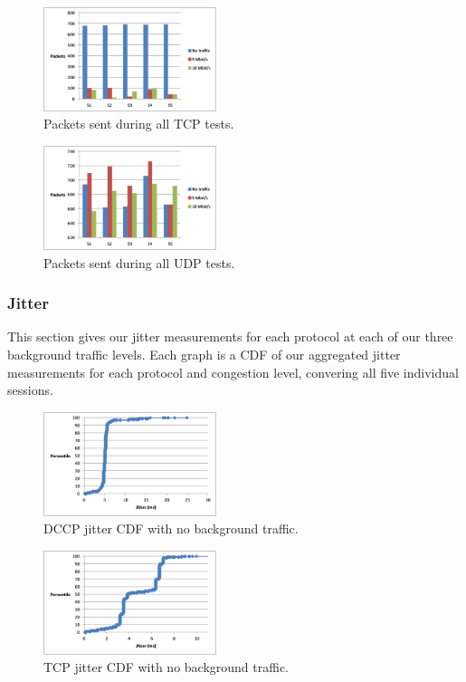 \documentclass[9pt,twocolumn]{article}
\begin{document}
\begin{figure}[h]
   \centering
      \includegraphics[width=0.45\textwidth]{pics/tcp_sent}
   \caption{Packets sent during all TCP tests.}
\label{fig:tcp_sent}
\end{figure}

\begin{figure}[h]
   \centering
      \includegraphics[width=0.45\textwidth]{pics/udp_sent}
   \caption{Packets sent during all UDP tests.}
\label{fig:udp_sent}
\end{figure}

\subsubsection{Jitter}

This section gives our jitter measurements for each protocol at each of our
three background traffic levels. Each graph is a CDF of our aggregated jitter
measurements for each protocol and congestion level, convering all five
individual sessions.

\begin{figure}[h]
   \centering
      \includegraphics[width=0.45\textwidth]{pics/dccp_none_jitter}
   \caption{DCCP jitter CDF with no background traffic.}
\label{fig:dccp_none_jitter}
\end{figure}

\begin{figure}[h]
   \centering
      \includegraphics[width=0.45\textwidth]{pics/tcp_none_jitter}
   \caption{TCP jitter CDF with no background traffic.}
\label{fig:tcp_none_jitter}
\end{figure}
\end{document}
